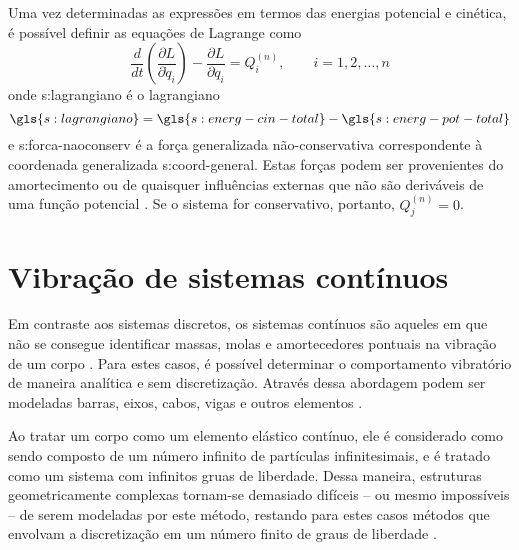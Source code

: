 \documentclass[12pt,oneside,english,brazil,lmodern,siglas,simbolos,cite=num]{ucsmonograph}
\begin{document}
	Uma vez determinadas as expressões em termos das energias potencial e cinética, é possível definir as equações de Lagrange como \cite{savi:2017}
	\begin{equation} \label{eqn:lagrange}
		\frac{d}{dt}\left(\frac{\partial L}{\partial \dot{q}_i}\right) - \frac{\partial L}{\partial q_i} = Q_i^{(n)}, \qquad i = 1, 2, \dots, n
	\end{equation}
	onde \gls{s:lagrangiano} é o lagrangiano
	\begin{equation}
		\gls{s:lagrangiano} = \gls{s:energ-cin-total}-\gls{s:energ-pot-total}
	\end{equation}
	e \gls{s:forca-naoconserv} é a força generalizada não-conservativa correspondente à coordenada generalizada \gls{s:coord-general}.
	Estas forças podem ser provenientes do amortecimento ou de quaisquer influências externas que não são deriváveis de uma função potencial \cite{rao:2008}.
	Se o sistema for conservativo, portanto, $ Q_j^{(n)} = 0 $.
	
	\section{Vibração de sistemas contínuos}
	Em contraste aos sistemas discretos, os sistemas contínuos são aqueles em que não se consegue identificar massas, molas e amortecedores pontuais na vibração de um corpo \cite{rao:2008}.
	Para estes casos, é possível determinar o comportamento vibratório de maneira analítica e sem discretização.
	Através dessa abordagem podem ser modeladas barras, eixos, cabos, vigas e outros elementos \cite{timoshenko:1974}.
	
	Ao tratar um corpo como um elemento elástico contínuo, ele é considerado como sendo composto de um número infinito de partículas infinitesimais, e é tratado como um sistema com infinitos gruas de liberdade.
	Dessa maneira, estruturas geometricamente complexas tornam-se demasiado difíceis -- ou mesmo impossíveis -- de serem modeladas por este método, restando para estes casos métodos que envolvam a discretização em um número finito de graus de liberdade \cite{timoshenko:1974}.
	
\end{document}
